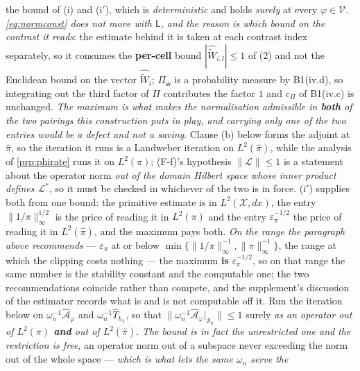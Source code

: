 \begin{definition}
the bound of \textup{(i)} and \textup{(i$'$)}, which is
\emph{deterministic} and holds \emph{surely} at every
$\varphi\in\mathcal V$. \emph{\eqref{eq:normconst} does not move with $\mathsf L$, and the reason is which
bound on the contrast it reads}: the estimate behind it is taken at each contrast index separately, so it
consumes the \textbf{per-cell} bound $|\widehat{\widetilde W}_{i,l}|\le1$ of
\textup{(2)} and not the Euclidean bound on the vector $\widehat{\widetilde W}_i$;
$\Pi_{\mathsf w}$ is a probability measure by B1(iv.d), so integrating out the third factor of $\Pi$
contributes the factor $1$ and $c_\Pi$ of B1(iv.c) is unchanged.
\emph{The maximum is what makes the normalisation admissible in \textbf{both} of the two pairings this
construction puts in play, and carrying only one of the two entries would be a defect and not a
saving}. Clause \textup{(b)} below forms the adjoint at $\hat\pi$, so the iteration it runs is a
Landweber iteration on $L^{2}(\hat\pi)$, while the analysis of \cref{prp:phirate} runs it on
$L^{2}(\pi)$; \textup{(F-f)}'s hypothesis $\|\mathcal L\|\le1$ is a statement about the operator norm
\emph{out of the domain Hilbert space whose inner product defines $\mathcal L^{\ast}$}, so it must be
checked in whichever of the two is in force. \textup{(i$'$)} supplies
both from one bound: the primitive estimate is in $L^{2}(\mathcal X,dx)$, the entry
$\|1/\pi\|_\infty^{1/2}$ is the price of reading it in $L^{2}(\pi)$ and the entry
$\varepsilon_\pi^{-1/2}$ the price of reading it in $L^{2}(\hat\pi)$, and the maximum pays both.
\emph{On the range the paragraph above recommends} --- $\varepsilon_\pi$ at or below
$\min\{\|1/\pi\|_\infty^{-1},\|\pi\|_\infty^{-1}\}$, the range at which the clipping costs nothing ---
the maximum \textbf{is} $\varepsilon_\pi^{-1/2}$, so on that range the same number is the stability
constant and the computable one; the two recommendations coincide rather than compete, and the
supplement's discussion of the estimator records what is and is not computable off it.
Run the iteration below on $\omega_n^{-1}\hat{\mathcal A}_\varphi$ and
$\omega_n^{-1}\hat T_{h_x}$, so that $\|\omega_n^{-1}\hat{\mathcal A}_\varphi\vert_{\mathcal S_n}\|\le1$
surely \emph{as an operator out of $L^{2}(\pi)$ \textbf{and} out of $L^{2}(\hat\pi)$}. \emph{The bound is
in fact the unrestricted one and the restriction is free}, an operator norm out of a subspace never
exceeding the norm out of the whole space --- \emph{which is what lets the same $\omega_n$ serve the
}
\end{definition}
